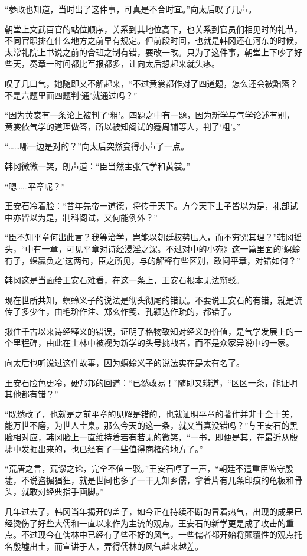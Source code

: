 “参政也知道，当时出了这件事，可真是不合时宜。”向太后叹了几声。

朝堂上文武百官的站位顺序，关系到其地位高下，也关系到官员们相见时的礼节，不同官职排在什么地方之前早有规定。但前段时间，也就是韩冈还在河东的时候，太常礼院上书说之前的合班之制有错，要改一改。只为了这件事，朝堂上下吵了好些天，奏章一时间都比军报都多，让向太后想起来就头疼。

叹了几口气，她随即又不解起来，“不过黄裳都作对了四道题，怎么还会被黜落？不是六题里面四题判‘通’就通过吗？”

“因为黄裳有一条论上被判了‘粗’。四题之中有一题，因为新学与气学论述有别，黄裳依气学的道理做答，所以被知阁试的蹇周辅等人，判了‘粗’。”

“……哪一边是对的？”向太后突然变得小声了一点。

韩冈微微一笑，朗声道：“臣当然主张气学和黄裳。”

“嗯……平章呢？”

王安石冷着脸：“昔年先帝一道德，将传于天下。方今天下士子皆以为是，礼部试中亦皆以为是，制科阁试，又何能例外？”

“臣不知平章何出此言？我等治学，岂能以朝廷权势压人，而不穷究其理？”韩冈摇头，“中有一章，可见平章对诗经浸淫之深。不过对中的小宛》这一篇里面的‘螟蛉有子，蜾蠃负之’这两句，臣之所见，与的解释有些区别，敢问平章，对错如何？”

韩冈这是当面给王安石难看，在这一条上，王安石根本无法辩驳。

现在世所共知，螟蛉义子的说法是彻头彻尾的错误。不要说王安石的有错，就是流传了多少年，由毛玠作注、郑玄作笺、孔颖达作疏的，都错了。

揪住千古以来诗经释义的错误，证明了格物致知对经义的价值，是气学发展上的一个里程碑，由此在士林中被视为新学的头号挑战者，而不是众家异说中的一家。

向太后也听说过这件故事，因为螟蛉义子的说法实在是太有名了。

王安石脸色更冷，硬邦邦的回道：“已然改易！”随即又辩道，“区区一条，能证明其他都有错？”

“既然改了，也就是之前平章的见解是错的，也就证明平章的著作并非十全十美，能万世不磨，为世人圭臬。那么今天的这一条，就又当真没错吗？”与王安石的黑脸相对应，韩冈脸上一直维持着若有若无的微笑，“一书，即便是其，在最近从殷墟中发掘出来的，也已经有了一些值得商榷的地方了。”

“荒唐之言，荒谬之论，完全不值一驳。”王安石哼了一声，“朝廷不遣重臣监守殷墟，不说盗掘猖狂，就是世间也多了一干无知乡儒，拿着片有几条印痕的龟板和骨头，就敢对经典指手画脚。”

几年过去了，韩冈当年揭开的盖子，如今正在持续不断的冒着热气，出现的成果已经烫伤了好些大儒和一直以来作为主流的观点。王安石的新学更是成了攻击的重点。不过现今在儒林中已经有了些不好的风气，一些儒者都开始将颠覆性的观点托名殷墟出土，而宣讲于人，弄得儒林的风气越来越差。

